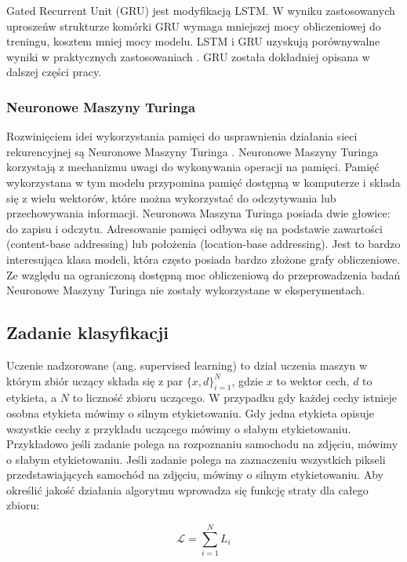 \documentclass[oneside, mag]{mgr}
\begin{document}
Gated Recurrent Unit (GRU) \cite{DBLP:journals/corr/ChoMGBSB14} jest modyfikacją LSTM. W wyniku zastosowanych uproszeńw strukturze komórki GRU wymaga mniejszej mocy obliczeniowej do treningu, kosztem mniej mocy modelu. LSTM i GRU uzyskują porównywalne wyniki w praktycznych zastosowaniach \cite{DBLP:journals/corr/ChungGCB14}. GRU została dokładniej opisana w dalszej części pracy.

\subsubsection{Neuronowe Maszyny Turinga}

Rozwinięciem idei wykorzystania pamięci do usprawnienia działania sieci rekurencyjnej są Neuronowe Maszyny Turinga \cite{DBLP:journals/corr/GravesWD14}. Neuronowe Maszyny Turinga korzystają z mechanizmu uwagi do wykonywania operacji na pamięci. Pamięć wykorzystana w tym modelu przypomina pamięć dostępną w komputerze i składa się z wielu wektorów, które można wykorzystać do odczytywania lub przechowywania informacji. Neuronowa Maszyna Turinga posiada dwie głowice: do zapisu i odczytu. Adresowanie pamięci odbywa się na podstawie zawartości (content-base addressing) lub położenia (location-base addressing). Jest to bardzo interesująca klasa modeli, która często posiada bardzo złożone grafy obliczeniowe. Ze względu na ograniczoną dostępną moc obliczeniową do przeprowadzenia badań Neuronowe Maszyny Turinga nie zostały wykorzystane w eksperymentach.

\subsection{Zadanie klasyfikacji}

Uczenie nadzorowane (ang. supervised learning) to dział uczenia maszyn w którym zbiór uczący składa się z par $\{x, d\}_{i=1}^N$, gdzie $x$ to wektor cech, $d$ to etykieta, a $N$ to liczność zbioru uczącego. W przypadku gdy każdej cechy istnieje osobna etykieta mówimy o silnym etykietowaniu. Gdy jedna etykieta opisuje wszystkie cechy z przykładu uczącego mówimy o słabym etykietowaniu. Przykładowo jeśli zadanie polega na rozpoznaniu samochodu na zdjęciu, mówimy o słabym etykietowaniu. Jeśli zadanie polega na zaznaczeniu wszystkich pikseli przedstawiających samochód na zdjęciu, mówimy o silnym etykietowaniu. Aby określić jakość działania algorytmu wprowadza się funkcję straty dla całego zbioru:

\begin{equation}
	\mathcal{L} = \sum_{i=1}^N L_i
\end{equation}
\end{document}
